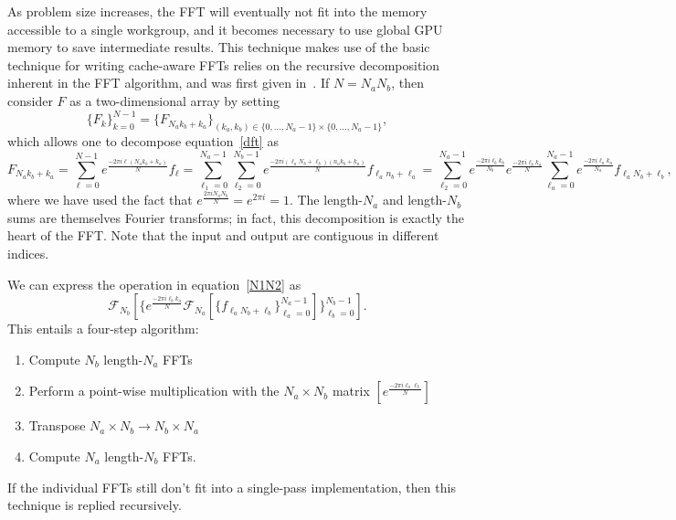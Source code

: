 \documentclass[blind]{gtac}
\def\({\left(}
\def\){\right)}
\def\[{\left[}
\def\]{\right]}
\begin{document}
As problem size increases, the FFT will eventually not fit into the
memory accessible to a single workgroup, and it becomes necessary to
use global GPU memory to save intermediate results.  This technique
makes use of the basic technique for writing cache-aware FFTs relies
on the recursive decomposition inherent in the FFT algorithm, and was
first given in~\cite{bailey1990ffts}.  If $N=N_aN_b$, then consider
$F$ as a two-dimensional array by setting
\begin{dmath}
  \{F_k\}_{k=0}^{N-1}
  =
  \{F_{N_a k_b + k_a} \}_{\(k_a,k_b\)\in\{0,\dots,N_a-1\}\times\{0,\dots,N_a-1\}},
\end{dmath}
which allows one to decompose equation~\eqref{dft} as
\begin{dmath}
  \label{N1N2}
  F_{N_a k_b + k_a}
  =
  \sum_{\ell = 0}^{N-1} e^{\frac{-2\pi{}i\ell{}(N_a k_b + k_a)}{N}} f_\ell
  =
  \sum_{\ell_1 = 0}^{N_a-1}
  \sum_{\ell_2 = 0}^{N_b-1}
  e^{\frac{-2\pi{}i\(\ell_a N_b + \ell_b\)(n_a k_b + k_a)}{N}}
  f_{\ell_a n_b + \ell_a}
  =
  \sum_{\ell_2 = 0}^{N_a-1}
  e^{\frac{-2\pi{}i\ell_b k_b}{N_b}}
  e^{\frac{-2\pi{}i\ell_b k_a }{N}}
  \sum_{\ell_a = 0}^{N_a-1}
  e^{\frac{-2\pi{}i\ell_a k_a}{N_a}}
  f_{\ell_a N_b + \ell_b},
\end{dmath}
where we have used the fact that
$e^{\frac{2\pi{}iN_aN_b}{N}}=e^{2\pi{}i}=1$.  The length-$N_a$ and
length-$N_b$ sums are themselves Fourier transforms; in fact, this
decomposition is exactly the heart of the FFT.  Note that the input
and output are contiguous in different indices.

We can express the operation in equation~\eqref{N1N2} as
\begin{dmath}
  \mathcal{F}_{N_b}\[
  \{
  e^{\frac{-2\pi{}i\ell_b k_a }{N}}
  \mathcal{F}_{N_a}\[\{f_{\ell_a N_b + \ell_b}\}_{\ell_a=0}^{N_a-1}\]
  \}_{\ell_b=0}^{N_b-1}
  \].
\end{dmath}
This entails a four-step algorithm:
\begin{enumerate}
\item Compute $N_b$ length-$N_a$ FFTs
\item Perform a point-wise multiplication with the $N_a\times{}N_b$
  matrix $\[e^{\frac{-2\pi{}i\ell_a\ell_b}{N}}\]$
\item Transpose $N_a\times{}N_b\rightarrow{}N_b\times{}N_a$
\item Compute $N_a$ length-$N_b$ FFTs.
\end{enumerate}
If the individual FFTs still don't fit into a single-pass
implementation, then this technique is replied recursively.
\end{document}
